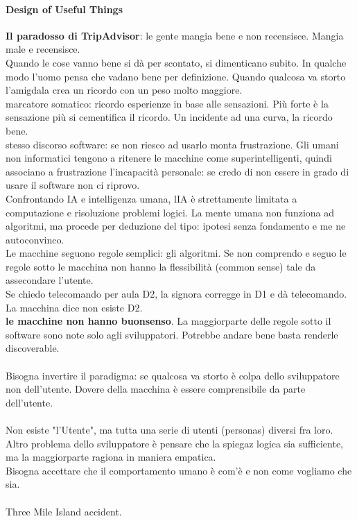 \documentclass[10pt]{article}
\begin{document}
\paragraph{Design of Useful Things} \textbf{Il paradosso di TripAdvisor}: le gente mangia bene e non recensisce. Mangia male e recensisce.\\
Quando le cose vanno bene si dà per scontato, si dimenticano subito. In qualche modo l'uomo pensa che vadano bene per definizione. Quando qualcosa va storto l'amigdala crea un ricordo con un peso molto maggiore.\\
marcatore somatico: ricordo esperienze in base alle sensazioni. Più forte è la sensazione più si cementifica il ricordo. Un incidente ad una curva, la ricordo bene.\\
stesso discorso software: se non riesco ad usarlo monta frustrazione. Gli umani non informatici tengono a ritenere le macchine come superintelligenti, quindi associano a frustrazione l'incapacità personale: se credo di non essere in grado di usare il software non ci riprovo.\\
Confrontando IA e intelligenza umana, lIA è strettamente limitata a computazione e risoluzione problemi logici. La mente umana non funziona ad algoritmi, ma procede per deduzione del tipo: ipotesi senza fondamento e me ne autoconvinco.\\
Le macchine seguono regole semplici: gli algoritmi. Se non comprendo e seguo le regole sotto le macchina non hanno la flessibilità (common sense) tale da assecondare l'utente.\\
Se chiedo telecomando per aula D2, la signora corregge in D1 e dà telecomando. La macchina dice non esiste D2.\\
\textbf{le macchine non hanno buonsenso}. La maggiorparte delle regole sotto il software sono note solo agli sviluppatori. Potrebbe andare bene basta renderle discoverable.\\\\
Bisogna invertire il paradigma: se qualcosa va storto è colpa dello sviluppatore non dell'utente. Dovere della macchina è essere comprensibile da parte dell'utente.\\\\
Non esiste "l'Utente", ma tutta una serie di utenti (personas) diversi fra loro.\\
Altro problema dello sviluppatore è pensare che la spiegaz logica sia sufficiente, ma la maggiorparte ragiona in maniera empatica.\\
Bisogna accettare che il comportamento umano è com'è e non come vogliamo che sia.\\\\
Three Mile Island accident.\\
\end{document}
